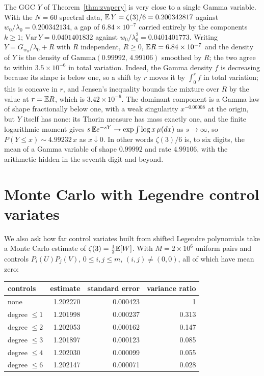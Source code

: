The GGC $Y$ of Theorem~\ref{thm:zvapery} is very close to a single Gamma variable. With the $N=60$ spectral data, $\mathbb{E}\,Y=\zeta(3)/6=0.200342817$ against $w_0/\lambda_0=0.200342134$, a gap of $6.84\times10^{-7}$ carried entirely by the components $k\ge1$; $\mathrm{Var}\,Y=0.0401401832$ against $w_0/\lambda_0^2=0.0401401773$. Writing $Y=G_{w_0}/\lambda_0+R$ with $R$ independent, $R\ge0$, $\mathbb{E} R=6.84\times10^{-7}$ and the density of $Y$ is the density of $\mathrm{Gamma}(0.99992,\,4.99106)$ smoothed by $R$; the two agree to within $3.5\times10^{-6}$ in total variation. Indeed, the Gamma density $f$ is decreasing because its shape is below one, so a shift by $r$ moves it by $\int_0^rf$ in total variation; this is concave in $r$, and Jensen's inequality bounds the mixture over $R$ by the value at $r=\mathbb{E} R$, which is $3.42\times10^{-6}$. The dominant component is a Gamma law of shape fractionally below one, with a weak singularity $x^{-0.00008}$ at the origin, but $Y$ itself has none: its Thorin measure has mass exactly one, and the finite logarithmic moment gives $s\,\mathbb{E} e^{-sY}\to\exp\int\log x\,\mu(dx)$ as $s\to\infty$, so $P(Y\le x)\sim4.99232\,x$ as $x\downarrow0$. In other words $\zeta(3)/6$ is, to six digits, the mean of a Gamma variable of shape $0.99992$ and rate $4.99106$, with the arithmetic hidden in the seventh digit and beyond.

\section{Monte Carlo with Legendre control variates}

We also ask how far control variates built from shifted Legendre polynomials take a Monte Carlo estimate of $\zeta(3)=\tfrac12\mathbb{E}[W]$. With $M=2\times10^6$ uniform pairs and controls $P_i(U)P_j(V)$, $0\le i,j\le m$, $(i,j)\ne(0,0)$, all of which have mean zero:

\begin{center}
\begin{tabular}{lrrr}
\toprule
controls & estimate & standard error & variance ratio\\
\midrule
none & 1.202270 & 0.000423 & 1\\
degree $\le1$ & 1.201998 & 0.000237 & 0.313\\
degree $\le2$ & 1.202053 & 0.000162 & 0.147\\
degree $\le3$ & 1.201897 & 0.000123 & 0.085\\
degree $\le4$ & 1.202030 & 0.000099 & 0.055\\
degree $\le6$ & 1.202147 & 0.000071 & 0.028\\
\bottomrule
\end{tabular}
\end{center}

